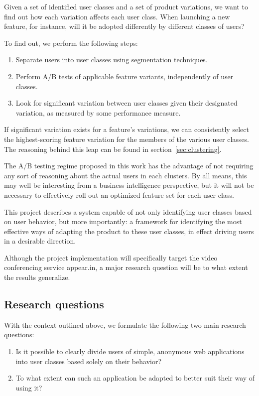 Given a set of identified user classes and a set of product variations, we want to find out how each variation affects each user class. When launching a new feature, for instance, will it be adopted differently by different classes of users?

To find out, we perform the following steps:

\begin{enumerate}
  \item Separate users into user classes using segmentation techniques.
  \item Perform A/B tests of applicable feature variants, independently of user classes.
  \item Look for significant variation between user classes given their designated variation, as measured by some performance measure.
\end{enumerate}

If significant variation exists for a feature's variations, we can consistently select the highest-scoring feature variation for the members of the various user classes. The reasoning behind this leap can be found in section~\ref{sec:clustering}.

The A/B testing regime proposed in this work has the advantage of not requiring any sort of reasoning about the actual users in each clusters. By all means, this may well be interesting from a business intelligence perspective, but it will not be necessary to effectively roll out an optimized feature set for each user class.

This project describes a system capable of not only identifying user classes based on user behavior, but more importantly: a framework for identifying the most effective ways of adapting the product to these user classes, in effect driving users in a desirable direction.

Although the project implementation will specifically target the video conferencing service appear.in, a major research question will be to what extent the results generalize.

\subsection{Research questions}
\label{sub:research_questions}

With the context outlined above, we formulate the following two main research questions:

\begin{enumerate}
  \item Is it possible to clearly divide users of simple, anonymous web applications into user classes based solely on their behavior?
  \item To what extent can such an application be adapted to better suit their way of using it?
\end{enumerate}


